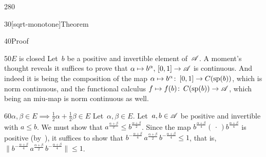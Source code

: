 \begin{parsec}{280}
\begin{point}{30}[sqrt-monotone]{Theorem}
\begin{point}{40}{Proof}
\begin{point}{50}{$E$ is closed}
Let~$b$ be a positive and invertible element of~$\mathscr{A}$.
A moment's thought reveals it suffices to 
prove that $\alpha\mapsto b^\alpha, \,[0,1]\to\mathscr{A}$
is continuous.
And indeed it is
being
the composition of the map $\alpha \mapsto b^\alpha\colon\,[0,1]
\to C(\mathrm{sp}(b))$, 
	which is norm continuous,
and the functional
	calculus $f\mapsto f(b)\colon\,
	C(\mathrm{sp}(b))\to \mathscr{A}$, which being an miu-map is norm continuous
	as well.
\end{point}
\begin{point}{60}{$\alpha,\beta\in E\implies \frac{1}{2}\alpha+\frac{1}{2}\beta
	\in E$}
Let~$\alpha,\beta\in E$. Let~$a,b\in\mathscr{A}$ be positive
and invertible with $a\leq b$.
We must show that $a^{\frac{\alpha+\beta}{2}}\leq 
b^{\frac{\alpha+\beta}{2}}$.
Since the map $b^{\frac{\alpha+\beta}{4}}(\,\cdot\,)
b^{\frac{\alpha+\beta}{4}}$
is positive (by~),
it suffices to show that
$b^{-\frac{\alpha+\beta}{4}}\,a^{\frac{\alpha+\beta}{2}}\,
b^{-\frac{\alpha+\beta}{4}} \leq 1$,
that is, 
$\|b^{-\frac{\alpha+\beta}{4}}\,a^{\frac{\alpha+\beta}{2}}\,
b^{-\frac{\alpha+\beta}{4}} \| \leq 1$.


\end{point}
\end{point}
\end{point}
\end{parsec}
